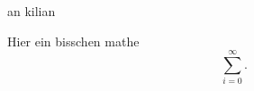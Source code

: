 \documentclass[class=article, crop=false]{standalone}
\begin{document}
\begin{zettel}{an kilian}

    Hier ein bisschen mathe
\[
    \sum_{i=0}^{\infty}
.\]

\end{zettel}
\end{document}
